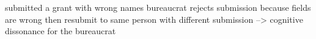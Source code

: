 
submitted a grant with wrong names
bureaucrat rejects submission because fields are wrong
then resubmit to same person with different submission
--> cognitive dissonance for the bureaucrat